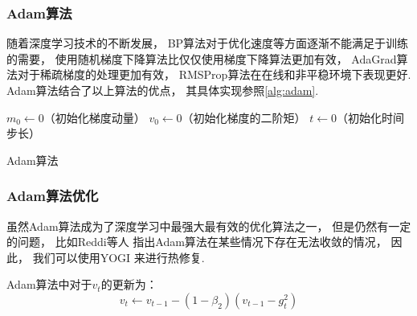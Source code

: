 \subsubsection{Adam算法}

随着深度学习技术的不断发展，
BP算法对于优化速度等方面逐渐不能满足于训练的需要，
使用随机梯度下降算法比仅仅使用梯度下降算法更加有效，
AdaGrad算法对于稀疏梯度的处理更加有效\cite{duchiAdaptiveSubgradientMethods2011}，
RMSProp算法在在线和非平稳环境下表现更好\cite{tielemanLecture5rmspropDivide2012}.
Adam算法结合了以上算法的优点，
其具体实现参照\cref{alg:adam}\cite{kingmaAdamMethodStochastic2017}.

\begin{algorithm}
    \KwData{$\beta_1,\beta_2\in [0,1)$：非负加权参数} %
    $m_0\leftarrow0$（初始化梯度动量）\;
    $v_0\leftarrow0$（初始化梯度的二阶矩）\;
    $t\leftarrow0$（初始化时间步长）\;
    \caption{Adam算法}\label{alg:adam}
\end{algorithm}

\subsubsection{Adam算法优化}

虽然Adam算法成为了深度学习中最强大最有效的优化算法之一，
但是仍然有一定的问题，
比如Reddi等人\cite{reddiConvergenceAdam2019}
指出Adam算法在某些情况下存在无法收敛的情况，
因此，
我们可以使用YOGI\cite{zaheerAdaptiveMethodsNonconvex2018}
来进行热修复.

Adam算法中对于$v_t$的更新为：
\begin{equation}
    v_t \leftarrow v_{t-1}-\left(1-\beta_{2}\right)\left(v_{t-1}-g_{t}^{2}\right)
\end{equation}


